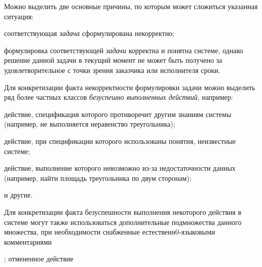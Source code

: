 \begin{SCn}
{{		Можно выделить две основные причины, по которым может сложиться указанная ситуация:
		\begin{scnitemize}
			\item соответствующая \textit{задача} сформулирована некорректно;
			\item формулировка соответствующей \textit{задачи} корректна и понятна системе, однако решение данной задачи в текущий момент не может быть получено за удовлетворительное с точки зрения заказчика или исполнителя сроки.
		\end{scnitemize}
		Для конкретизации факта некорректности формулировки задачи можно выделить ряд более частных классов \textit{безуспешно выполненных действий}, например:
		\begin{scnitemize}
			\item действие, спецификация которого противоречит другим знаниям системы (например, не выполняется неравенство треугольника);
			\item действие, при спецификации которого использованы понятия, неизвестные системе;
			\item действие, выполнение которого невозможно из-за недостаточности данных (например, найти площадь треугольника по двум сторонам);
			\item и другие.
		\end{scnitemize}
		Для конкретизации факта безуспешности выполнения некоторого действия в системе могут также использоваться дополнительные подмножества данного множества, при необходимости снабженные естественн0-языковыми комментариями}
	; отмененное действие
}




\end{SCn}
